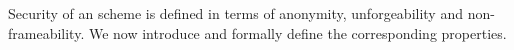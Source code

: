 
Security of an \UAS scheme is defined in terms of anonymity, unforgeability and
non-frameability. We now introduce and formally define the corresponding
properties.





